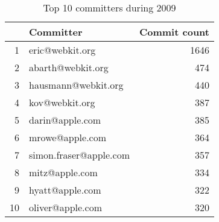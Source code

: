 \begin{table}[!htpb]
\begin{center}
\begin{tabular}{rlr}
  \hline
 & Committer & Commit count \\ 
  \hline
1 & eric@webkit.org & 1646 \\ 
  2 & abarth@webkit.org & 474 \\ 
  3 & hausmann@webkit.org & 440 \\ 
  4 & kov@webkit.org & 387 \\ 
  5 & darin@apple.com & 385 \\ 
  6 & mrowe@apple.com & 364 \\ 
  7 & simon.fraser@apple.com & 357 \\ 
  8 & mitz@apple.com & 334 \\ 
  9 & hyatt@apple.com & 322 \\ 
  10 & oliver@apple.com & 320 \\ 
   \hline
\end{tabular}
\caption{Top 10 committers during 2009}
\label{commits:2009top20}
\end{center}
\end{table}
